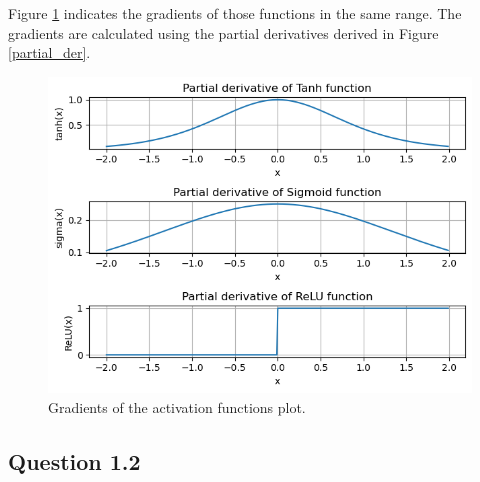 \documentclass{assignment}
\begin{document}
Figure \ref{fig:activation_functions_gradient} indicates the gradients of those functions in the same range. The gradients are calculated using the partial derivatives derived in Figure \ref{partial_der}.

\begin{figure}[htbp!]
    \centering
    \includegraphics[width=1\textwidth]{figures/q1_2.png}
    \caption{Gradients of the activation functions plot.}
    \label{fig:activation_functions_gradient}
\end{figure}



\subsection{Question 1.2}
\end{document}
